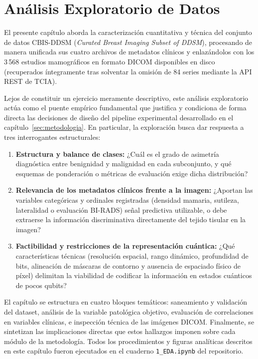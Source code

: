 
\newpage
\section{Análisis Exploratorio de Datos}
\label{sec:eda}

El presente capítulo aborda la caracterización cuantitativa y técnica
del conjunto de datos CBIS-DDSM (\textit{Curated Breast Imaging Subset of
DDSM}), procesando de manera unificada sus cuatro archivos de metadatos
clínicos y enlazándolos con los 3\,568 estudios mamográficos en formato
DICOM disponibles en disco (recuperados íntegramente tras solventar la
omisión de 84 series mediante la API REST de TCIA).

Lejos de constituir un ejercicio meramente descriptivo, este análisis
exploratorio actúa como el puente empírico fundamental que justifica
y condiciona de forma directa las decisiones de diseño del pipeline
experimental desarrollado en el capítulo~\ref{sec:metodologia}. En
particular, la exploración busca dar respuesta a tres interrogantes
estructurales:
\begin{enumerate}
  \item \textbf{Estructura y balance de clases:} ¿Cuál es el grado de
        asimetría diagnóstica entre benignidad y malignidad en cada
        subconjunto, y qué esquemas de ponderación o métricas de
        evaluación exige dicha distribución?
  \item \textbf{Relevancia de los metadatos clínicos frente a la imagen:}
        ¿Aportan las variables categóricas y ordinales registradas
        (densidad mamaria, sutileza, lateralidad o evaluación BI-RADS)
        señal predictiva utilizable, o debe extraerse la información
        discriminativa directamente del tejido tisular en la imagen?
  \item \textbf{Factibilidad y restricciones de la representación cuántica:}
        ¿Qué características técnicas (resolución espacial, rango dinámico,
        profundidad de bits, alineación de máscaras de contorno y
        ausencia de espaciado físico de píxel) delimitan la viabilidad
        de codificar la información en estados cuánticos de pocos qubits?
\end{enumerate}

El capítulo se estructura en cuatro bloques temáticos: saneamiento y
validación del dataset, análisis de la variable patológica objetivo,
evaluación de correlaciones en variables clínicas, e inspección técnica
de las imágenes DICOM. Finalmente, se sintetizan las implicaciones
directas que estos hallazgos imponen sobre cada módulo de la metodología.
Todos los procedimientos y figuras analíticas descritos en este capítulo
fueron ejecutados en el cuaderno \texttt{1\_EDA.ipynb} del repositorio.
